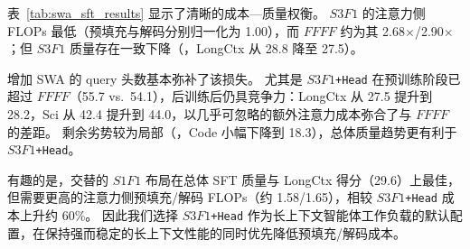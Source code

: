 表~\ref{tab:swa_sft_results} 显示了清晰的成本—质量权衡。
$S3F1$ 的注意力侧 FLOPs 最低（预填充与解码分别归一化为 1.00），而 $FFFF$ 约为其 2.68$\times$/2.90$\times$；但 $S3F1$ 质量存在一致下降（\eg，LongCtx 从 28.8 降至 27.5）。

增加 SWA 的 query 头数基本弥补了该损失。
尤其是 \texttt{$S3F1$+Head} 在预训练阶段已超过 $FFFF$（55.7 vs.\ 54.1），后训练后仍具竞争力：LongCtx 从 27.5 提升到 28.2，Sci 从 42.4 提升到 44.0，以几乎可忽略的额外注意力成本弥合了与 $FFFF$ 的差距。
剩余劣势较为局部（\eg，Code 小幅下降到 18.3），总体质量趋势更有利于 \texttt{$S3F1$+Head}。

有趣的是，交替的 $S1F1$ 布局在总体 SFT 质量与 LongCtx 得分（29.6）上最佳，但需要更高的注意力侧预填充/解码 FLOPs（约 1.58/1.65），相较 \texttt{$S3F1$+Head} 成本上升约 60\%。
因此我们选择 \texttt{$S3F1$+Head} 作为长上下文智能体工作负载的默认配置，在保持强而稳定的长上下文性能的同时优先降低预填充/解码成本。


\begin{table}[t]
\centering
\small
\renewcommand{\arraystretch}{1.12}
\caption{30B-A3B 的下游结果。$F$ 表示全注意力，$S$ 表示 SWA。
$S3F1$ 指混合布局中 3 个 $S$ 层后接 1 个 $F$ 层。
相对 FLOPs 以 $S3F1$ 为基准，并在 64k/256k 上下文上取平均（表~\ref{tab:rel}）。
Pre-train Avg. 汇总了通用、数学与代码基准（表~\ref{tab:ablation_study}）。}
\label{tab:swa_sft_results}
\end{table}

